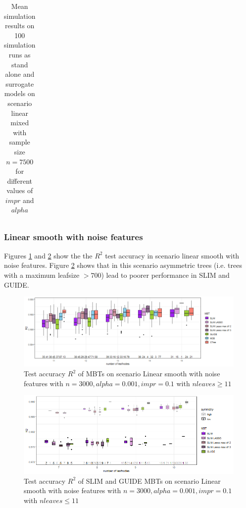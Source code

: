 \begin{table}[!htb]
\begin{tabular}[t]{l|l|r|r|r|r|r|r|r|r|r}
\end{tabular}
\caption{Mean simulation results on 100 simulation runs as stand alone and surrogate models on scenario linear mixed with sample size $n = 7500$ for different values of $impr$ and $alpha$}
\label{tab:app_linear_mixed_5000}

\end{table}


\clearpage

\subsubsection{Linear smooth with noise features}
Figures \ref{fig:app_lasso_standalone_r2_test} and \ref{fig:app_lasso_standalone_r2_test_slim} show the the $R^2$ test accuracy in scenario linear smooth with noise features. Figure \ref{fig:app_lasso_standalone_r2_test_slim} shows that in this scenario asymmetric trees (i.e. trees with a maximum leafsize $> 700$) lead to poorer performance in SLIM and GUIDE.


\begin{figure}[!htb]
     \centering
     
    \includegraphics[width=16cm]{Figures/simulations/chapter_5_simulation_study/lasso/lasso_standalone_r2_test.png}
    \caption{Test accuracy $R^2$ of MBTs on scenario Linear smooth with noise features with $n=3000, alpha = 0.001, impr = 0.1$ with $n leaves \geq 11$}
    \label{fig:app_lasso_standalone_r2_test}
\end{figure} 

\begin{figure}[!htb]
     \centering
    \includegraphics[width=16cm]{Figures/simulations/chapter_5_simulation_study/lasso/lasso_standalone_r2_test_slim.png}
    \caption{Test accuracy $R^2$ of SLIM and GUIDE MBTs on scenario Linear smooth with noise features with $n=3000, alpha = 0.001, impr = 0.1$ with $n leaves \leq 11$}
\label{fig:app_lasso_standalone_r2_test_slim}
\end{figure} 

